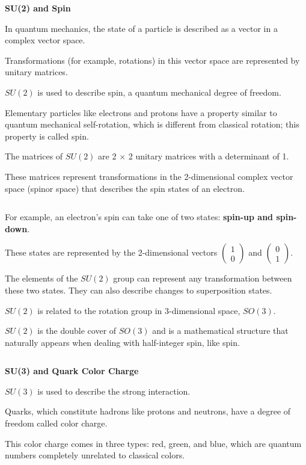 \documentclass[uplatex,a4j,12pt,dvipdfmx]{jsarticle}
\begin{document}
${}$

\textbf{SU(2) and Spin}

In quantum mechanics, the state of a particle is described as a vector in a complex vector space.

Transformations (for example, rotations) in this vector space are represented by unitary matrices.

$SU(2)$ is used to describe spin, a quantum mechanical degree of freedom.

Elementary particles like electrons and protons have a property similar to quantum mechanical self-rotation, which is different from classical rotation; this property is called spin.

The matrices of $SU(2)$ are 2 $\times$ 2 unitary matrices with a determinant of 1.

These matrices represent transformations in the 2-dimensional complex vector space (spinor space) that describes the spin states of an electron.

${}$

For example, an electron's spin can take one of two states: \textbf{spin-up and spin-down}.

These states are represented by the 2-dimensional vectors
$
	\begin{pmatrix} 1 \\
		0\end{pmatrix}
$
and
$
	\begin{pmatrix} 0 \\
		1\end{pmatrix}
$.

The elements of the $SU(2)$ group can represent any transformation between these two states.
They can also describe changes to superposition states.

$SU(2)$ is related to the rotation group in 3-dimensional space, $SO(3)$.

$SU(2)$ is the double cover of $SO(3)$ and is a mathematical structure that naturally appears when dealing with half-integer spin, like spin.

${}$

\textbf{SU(3) and Quark Color Charge}

$SU(3)$ is used to describe the strong interaction.

Quarks, which constitute hadrons like protons and neutrons, have a degree of freedom called color charge.

This color charge comes in three types: red, green, and blue, which are quantum numbers completely unrelated to classical colors.
\end{document}
